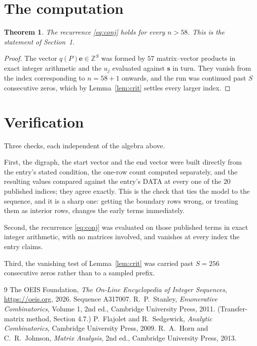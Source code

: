 \documentclass[11pt,a4paper]{article}
\theoremstyle{plain}
\newtheorem{theorem}{Theorem}
\theoremstyle{definition}
\begin{document}
\section{The computation}

\begin{theorem}
The recurrence \eqref{eq:conj} holds for every $n>58$. This is the statement of
Section~1.
\end{theorem}

\begin{proof}
The vector $q(P)\mathbf{e}\in\mathbb{Z}^{S}$ was formed by $57$ matrix--vector
products in exact integer arithmetic and the $u_j$ evaluated against $\mathbf{s}$ in turn.
They vanish from the index corresponding to $n=58+1$ onwards, and the run was continued
past $S$ consecutive zeros, which by Lemma~\ref{lem:crit} settles every larger index.
\end{proof}

\section{Verification}

Three checks, each independent of the algebra above.

First, the digraph, the start vector and the end vector were built directly from the
entry's stated condition, the one-row count computed separately, and the resulting values
compared against the entry's DATA at every one of the $20$ published indices; they
agree exactly. This is the check that ties the model to the sequence, and it is a sharp one:
getting the boundary rows wrong, or treating them as interior rows, changes the early terms
immediately.

Second, the recurrence \eqref{eq:conj} was evaluated on those published terms in exact
integer arithmetic, with no matrices involved, and vanishes at every index the entry claims.

Third, the vanishing test of Lemma~\ref{lem:crit} was carried past $S=256$ consecutive
zeros rather than to a sampled prefix.

\begin{thebibliography}{9}
 The OEIS Foundation, \emph{The On-Line Encyclopedia of Integer
Sequences}, \url{https://oeis.org}, 2026. Sequence A317007.
 R.~P.~Stanley, \emph{Enumerative Combinatorics}, Volume 1, 2nd ed.,
Cambridge University Press, 2011. (Transfer-matrix method, Section 4.7.)
 P.~Flajolet and R.~Sedgewick, \emph{Analytic Combinatorics}, Cambridge
University Press, 2009.
 R.~A.~Horn and C.~R.~Johnson, \emph{Matrix Analysis}, 2nd ed., Cambridge
University Press, 2013.
\end{thebibliography}
\end{document}
